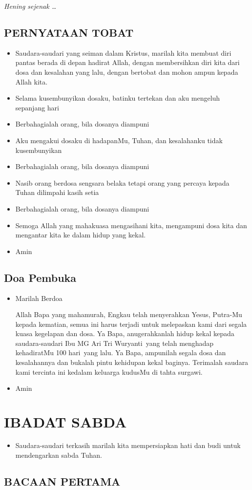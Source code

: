 \documentclass[a5paper,headsepline,titlepage,11pt,nnormalheadings,DIVcalc]{scrbook}
\newcommand{\BU}[1]{\begin{itemize} \item[U:] #1 \end{itemize}}
\newcommand{\BP}[1]{\begin{itemize} \item[P:] #1 \end{itemize}}
\newcommand{\namaalm}{Ibu MG Ari Tri Wuryanti~}
\newcommand{\peringatan}{100 hari~}
\begin{document}
\emph{Hening sejenak \dots}
  
\subsection*{PERNYATAAN TOBAT}
\BP{Saudara-saudari yang seiman dalam Kristus, marilah kita membuat diri pantas berada di depan hadirat Allah, dengan membersihkan diri kita dari dosa dan kesalahan yang lalu, dengan bertobat dan mohon ampun kepada Allah kita.}

\BP{Selama kusembunyikan dosaku, batinku tertekan dan aku mengeluh sepanjang hari}
\BU{Berbahagialah orang, bila dosanya diampuni}
\BP{Aku mengakui dosaku di hadapanMu, Tuhan, dan kesalahanku tidak kusembunyikan}
\BU{Berbahagialah orang, bila dosanya diampuni}
\BP{Nasib orang berdosa sengsara belaka tetapi orang yang percaya kepada Tuhan dilimpahi kasih setia}
\BU{Berbahagialah orang, bila dosanya diampuni}
\BP{Semoga Allah yang mahakuasa mengasihani kita, 
mengampuni dosa kita dan mengantar kita ke dalam hidup 
yang kekal.}

\BU{Amin}

\subsection*{Doa Pembuka}
\BP{Marilah Berdoa 

Allah Bapa yang mahamurah, Engkau telah menyerahkan 
Yesus, Putra-Mu kepada kematian, semua ini harus terjadi 
untuk melepaskan kami dari segala kuasa kegelapan dan 
dosa. Ya Bapa, anugerahkanlah hidup kekal kepada 
saudara-saudari \namaalm yang telah menghadap 
kehadiratMu \peringatan yang lalu. Ya Bapa, ampunilah 
segala dosa dan kesalahannya dan bukalah pintu 
kehidupan kekal baginya. Terimalah saudara kami 
tercinta ini kedalam keluarga kudusMu di tahta surgawi. }

\BU{Amin} 
 
\section*{IBADAT SABDA}
\BP{Saudara-saudari terkasih marilah kita mempersiapkan hati 
dan budi untuk mendengarkan sabda Tuhan.} 

\subsection*{BACAAN PERTAMA}
\end{document}
